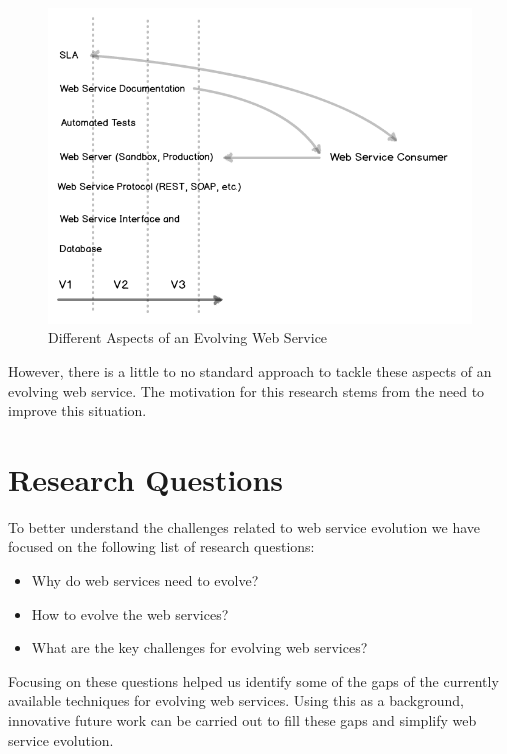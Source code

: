 \documentclass[runningheads,a4paper]{llncs}
\begin{document}
\begin{figure}[ht]
  \centering
  \includegraphics[width=\textwidth]{web_service_layers.png}
    \caption{Different Aspects of an Evolving Web Service}
  \label{fig:web_service_layers}
\end{figure}

However, there is a little to no standard approach to tackle these aspects of an evolving web service. The motivation for this research stems from the need to improve this situation.


\section{Research Questions} %
\label{sec:research_questions}
To better understand the challenges related to web service evolution we have focused on the following list of research questions:

\begin{itemize}
  \item Why do web services need to evolve?
  \item How to evolve the web services?
  \item What are the key challenges for evolving web services?
\end{itemize}

Focusing on these questions helped us identify some of the gaps of the currently available techniques for evolving web services. Using this as a background, innovative future work can be carried out to fill these gaps and simplify web service evolution.
\end{document}
